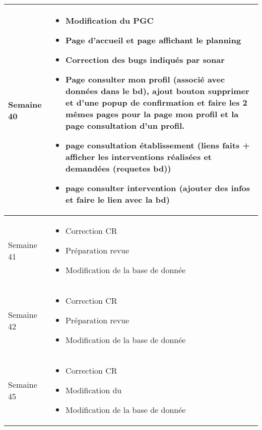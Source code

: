 \documentclass [a4paper] {article}
\begin{document}
\begin{longtable}{|>{\columncolor{gray!40}}p{2cm}|p{12cm}|}
	Semaine 40 & \begin{itemize}
	\item Modification du PGC
	\item Page d'accueil et page affichant le planning
	\item Correction des bugs indiqués par sonar
	\item Page consulter mon profil (associé avec données dans le bd), ajout bouton supprimer et d'une popup de confirmation et faire les 2 mêmes pages pour la page mon profil et la page consultation d'un profil. 
	\item page consultation établissement (liens faits + afficher les interventions réalisées et demandées (requetes bd))
	\item page consulter intervention (ajouter des infos et faire le lien avec la bd)
	\end{itemize} \\
	\hline
	
	Semaine 41 & \begin{itemize}
	\item Correction CR
	\item Préparation revue 
	\item Modification de la base de donnée
	\end{itemize} \\
	\hline

	Semaine 42 & \begin{itemize}
	\item Correction CR
	\item Préparation revue 
	\item Modification de la base de donnée
	\end{itemize} \\
	\hline

	Semaine 45 & \begin{itemize}
	\item Correction CR
	\item Modification du \PGC
	\item Modification de la base de donnée
	\end{itemize} \\
	\hline
	
	
	
\end{longtable}
\end{document}
